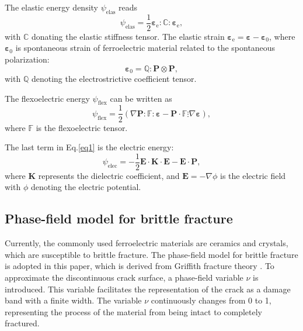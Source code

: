 \documentclass[final,times,fleqn,11pt]{elsarticle}
\begin{document}
The elastic energy density $\psi_\mathrm{elas}$ reads
\begin{equation}\label{f_elas}
    \psi_\mathrm{elas}=\frac{1}{2}\mathbf{\varepsilon}_\mathrm{e}:\mathbb{C}:\mathbf{\varepsilon}_\mathrm{e},
\end{equation}
with $\mathbb{C}$ donating the elastic stiffness tensor. The elastic strain $\mathbf{\varepsilon}_\mathrm{e}=\mathbf{\varepsilon}-\mathbf{\varepsilon}_0$, where $\mathbf{\varepsilon}_0$ is spontaneous strain of ferroelectric material related to the spontaneous polarization:
\begin{equation}\label{eq5}
    \mathbf{\varepsilon}_0=\mathbb{Q}:\mathbf{P}\otimes\mathbf{P},
\end{equation}
with $\mathbb{Q}$ denoting the electrostrictive coefficient tensor.

The flexoelectric energy $\psi_\mathrm{flex}$ can be written as 
\begin{equation}
    \psi_\mathrm{flex}=\frac{1}{2}(\nabla \mathbf{P}: \mathbb{F}: \mathbf{\varepsilon}-\mathbf{P}\cdot\mathbb{F}\vdots\nabla\mathbf{\varepsilon}),
\end{equation}
where $\mathbb{F}$ is the flexoelectric tensor. 

The last term in Eq.\eqref{eq1} is the electric energy:
\begin{equation}
    \psi_\mathrm{elec}=-\frac{1}{2}\mathbf{E}\cdot \mathbf{K} \cdot \mathbf{E}-\mathbf{E}\cdot\mathbf{P},
\end{equation} 
where $\mathbf{K}$ represents the dielectric coefficient, and $\mathbf{E}=-\nabla \phi$ is the electric field with $\phi$ denoting the electric potential.

\subsection{Phase-field model for brittle fracture}
Currently, the commonly used ferroelectric materials are ceramics and crystals, which are susceptible to brittle fracture. The phase-field model for brittle fracture is adopted in this paper, which is derived from Griffith fracture theory \cite{francfort_revisiting_1998, bourdin_numerical_2000}. To approximate the discontinuous crack surface, a phase-field variable $\nu$ is introduced. This variable facilitates the representation of the crack as a damage band with a finite width. The variable $\nu$ continuously changes from 0 to 1, representing the process of the material from being intact to completely fractured. 
\end{document}
